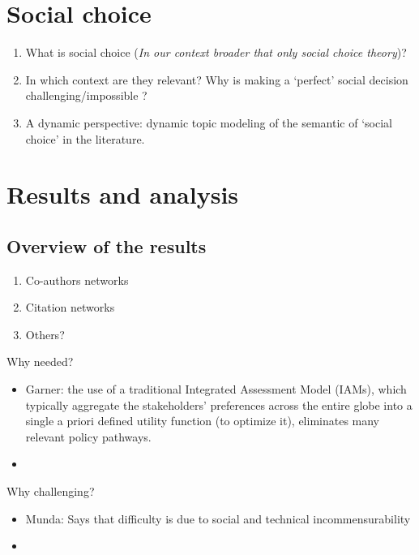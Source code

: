 \documentclass[a4paper,10pt]{article}
\begin{document}
\begin{multicols}{2}
\section{Social choice}
\label{Social choice}

\begin{enumerate}
	\setlength\itemsep{-0.1em}
	\item What is social choice ({\itshape In our context broader that only social choice theory})?
	\item In which context are they relevant? Why is making a `perfect' social decision challenging/impossible ? 
	\item A dynamic perspective: dynamic topic modeling of the semantic of `social choice' in the literature.
\end{enumerate}

\section{Results and analysis}
\label{Results and analysis}

\subsection{Overview of the results}
\begin{enumerate}
	\setlength\itemsep{-0.1em}
	\item Co-authors networks
	\item Citation networks
	\item Others?
\end{enumerate}

Why needed?
\begin{itemize}
	\setlength\itemsep{-0.1em}
	\item Garner: the use of a traditional Integrated Assessment Model (IAMs), which typically aggregate the stakeholders' preferences across the entire globe into a single a priori defined utility function (to optimize it), eliminates many relevant policy pathways.
	\item
\end{itemize}

Why challenging?
\begin{itemize}
	\setlength\itemsep{-0.1em}
	\item Munda: Says that difficulty is due to social and technical incommensurability
	\item
\end{itemize}
	

\end{multicols}
\end{document}
